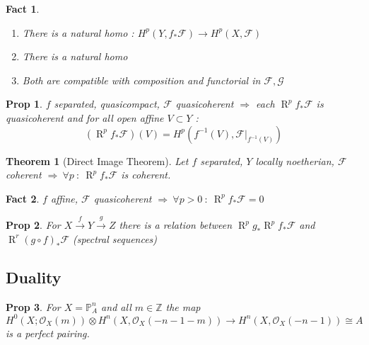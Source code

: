 \documentclass[a4paper, 12pt]{article}
\newcommand{\caf}{\mathcal{F}}
\newcommand{\cag}{\mathcal{G}}
\newcommand{\ox}{\mathcal{O}_X}
\newcommand{\bbp}{\mathbb{P}}
\newcommand{\bbz}{\mathbb{Z}}
\newtheorem*{prop}{Prop}
\newtheorem*{fact}{Fact}
\newtheorem*{thm}{Theorem}
\DeclareMathOperator{\R}{R}
\begin{document}
	\begin{fact}
		\begin{enumerate}
			\item There is a natural homo : $ H^p(Y,f_* \caf) \rightarrow H^p(X,\caf) $
			\item There is a natural homo
		
			\item Both are compatible with composition and functorial in $ \caf, \cag $
		\end{enumerate}
	\end{fact}
	
	\begin{prop}
		$ f $ separated, quasicompact, $ \caf $ quasicoherent $ \Rightarrow $ each $ \R^p f_* \caf  $ is quasicoherent and for all open affine $ V \subset Y $ : 
		\[ (\R ^p f_* \caf) (V) = H^p(f^{-1}(V), \caf|_{f^{-1}(V)}) \]
	\end{prop}
		
	\begin{thm}[Direct Image Theorem]
		Let $ f $ separated, $ Y $ locally noetherian, $ \caf $ coherent $ \Rightarrow \: \forall p \: : \: \R^pf_* \caf $ is coherent.   
	\end{thm}
	
	\begin{fact}
		$ f $ affine, $ \caf $ quasicoherent $ \Rightarrow \: \forall p> 0 \: : \: \R^pf_*\caf =0 $
	\end{fact}
	
	\begin{prop}
		For $ X \xrightarrow{f} Y \xrightarrow{g} Z $ there is a relation between $ \R^pg_* \R^pf_* \caf  $ and $ \R^r (g \circ f)_* \caf $ (spectral sequences)
	\end{prop}
	
	
	
	
	
	
	\subsection{Duality}
	
	\begin{prop}
		For $ X = \bbp^n_A $ and all $ m \in \bbz $ the map 
		\[ H^0(X;\ox(m)) \otimes H^n(X, \ox(-n-1-m)) \longrightarrow H^n(X, \ox(-n-1)) \cong A \]
		is a perfect pairing.
	\end{prop}
	
\end{document}
